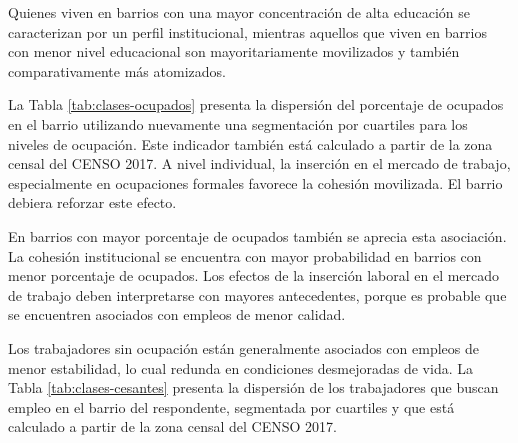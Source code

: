 \documentclass[
  12pt,
]{book}
\begin{document}
Quienes viven en barrios con una mayor concentración de alta educación se caracterizan por un perfil institucional, mientras aquellos que viven en barrios con menor nivel educacional son mayoritariamente movilizados y también comparativamente más atomizados.

La Tabla \ref{tab:clases-ocupados} presenta la dispersión del porcentaje de ocupados en el barrio utilizando nuevamente una segmentación por cuartiles para los niveles de ocupación. Este indicador también está calculado a partir de la zona censal del CENSO 2017. A nivel individual, la inserción en el mercado de trabajo, especialmente en ocupaciones formales favorece la cohesión movilizada. El barrio debiera reforzar este efecto.

\begin{table}

\caption{\label{tab:clases-ocupados}Efecto de la cantidad de trabajadores ocupados sobre las clases de cohesion social}
\centering
{}
\end{table}

En barrios con mayor porcentaje de ocupados también se aprecia esta asociación. La cohesión institucional se encuentra con mayor probabilidad en barrios con menor porcentaje de ocupados. Los efectos de la inserción laboral en el mercado de trabajo deben interpretarse con mayores antecedentes, porque es probable que se encuentren asociados con empleos de menor calidad.

Los trabajadores sin ocupación están generalmente asociados con empleos de menor estabilidad, lo cual redunda en condiciones desmejoradas de vida. La Tabla \ref{tab:clases-cesantes} presenta la dispersión de los trabajadores que buscan empleo en el barrio del respondente, segmentada por cuartiles y que está calculado a partir de la zona censal del CENSO 2017.
\end{document}
